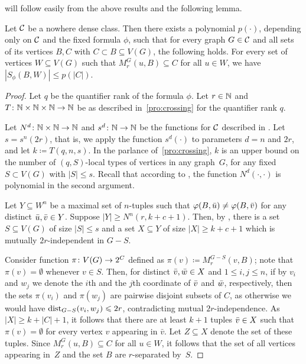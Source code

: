  will follow easily from the above results and the following lemma.

\begin{lemma}\label{lem:num-types-same-class}
Let $\mathcal{C}$ be a nowhere dense class.
Then there exists a polynomial $p(\cdot)$, depending only on $\mathcal{C}$ and the fixed formula $\phi$, such that for every graph $G\in\mathcal{C}$ and all sets of its vertices $B,C$ with
$C\subset B\subseteq V(G)$, the following holds.
For every set of vertices $W\subseteq V(G)$ such that 
$M_r^G(u,B)\subseteq C$ for all $u\in W$, 
we have $|S_\phi(B,W)|\le p(|C|)$.
\end{lemma}
\begin{proof}
Let $q$ be the quantifier rank of the formula $\phi$.
Let $r\in \mathbb{N}$ and~$T\colon \mathbb{N}\times \mathbb{N}\times \mathbb{N}\to \mathbb{N}$  
be as described in~\cref{pro:crossing} for the quantifier rank $q$.

Let $N^d\colon \mathbb{N}\times\mathbb{N}\to\mathbb{N}$ and $s^d\colon \mathbb{N}\to\mathbb{N}$ be
the functions for $\mathcal{C}$ described in . 
Let $s=s^n(2r)$, that is, we apply the function $s^d(\cdot)$ to
parameters $d=n$ and $2r$, and let $k\coloneqq T(q,n,s)$. In the parlance of~\cref{pro:crossing},
$k$ is an upper bound on the number of $(q,S)$-local types of vertices in any graph~$G$,
for any fixed $S\subset V(G)$ with $|S|\le s$. Recall that according
to , the function $N^d(\cdot,\cdot)$ is polynomial in the second
argument. 

Let $Y\subseteq W^n$ be a maximal set of $n$-tuples 
such that $\varphi(B,\bar{u})\neq \varphi(B,\bar{v})$ 
for any distinct $\bar{u}, \bar{v}\in Y$.
Suppose $|Y|\geq N^n(r,k+c+1)$. Then, by , there is a  
set $S\subseteq V(G)$ of size $|S|\leq s$ 
and a set $X\subseteq Y$ of size $|X|\geq k+c+1$ which is 
mutually $2r$-independent in $G-S$. 

Consider function $\pi\colon V(G)\to 2^C$
defined as
 $\pi(v)\coloneqq M_r^{G-S}(v,B)$; note that $\pi(v)=\emptyset$ whenever $v\in S$.
 Then, for distinct $\bar{v},\bar{w}\in X$
 and $1\leq i,j\leq n$, if by $v_i$ and $w_j$ we denote the $i$th and the $j$th coordinate of $\bar{v}$ and $\bar{w}$, respectively, then 
 the sets $\pi(v_i)$ and $\pi(w_j)$ are pairwise disjoint subsets of $C$,
as otherwise we would have \mbox{$\mathrm{dist}_{G-S}(v_i,w_j)\leqslant 2r$},
contradicting mutual $2r$-independence.
As  $|X|\ge k+|C|+1$, it follows that 
there are at least $k+1$ tuples $\bar{v}\in X$
such that  $\pi(v)=\emptyset$ for every vertex $v$ appearing in $\bar v$. Let $Z\subseteq X$ denote the set of these tuples. Since
$M_r^G(u,B)\subseteq C$ for all $u\in W$, it follows that the set of all vertices appearing in~$Z$ and the
set $B$ are $r$-separated by~$S$.


\end{proof}
